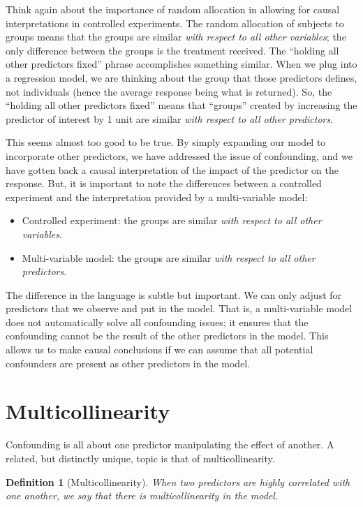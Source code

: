 \documentclass[
]{book}
\providecommand{\tightlist}{%
  \setlength{\itemsep}{0pt}\setlength{\parskip}{0pt}}
\theoremstyle{plain}
\theoremstyle{mydefn}
\newtheorem{definition}{Definition}[chapter]
\theoremstyle{myexmpl}
\theoremstyle{remark}
\begin{document}
Think again about the importance of random allocation in allowing for causal interpretations in controlled experiments. The random allocation of subjects to groups means that the groups are similar \emph{with respect to all other variables}; the only difference between the groups is the treatment received. The ``holding all other predictors fixed'' phrase accomplishes something similar. When we plug into a regression model, we are thinking about the group that those predictors defines, not individuals (hence the average response being what is returned). So, the ``holding all other predictors fixed'' means that ``groups'' created by increasing the predictor of interest by 1 unit are similar \emph{with respect to all other predictors}.

This seems almost too good to be true. By simply expanding our model to incorporate other predictors, we have addressed the issue of confounding, and we have gotten back a causal interpretation of the impact of the predictor on the response. But, it is important to note the differences between a controlled experiment and the interpretation provided by a multi-variable model:

\begin{itemize}
\tightlist
\item
  Controlled experiment: the groups are similar \emph{with respect to all other variables}.
\item
  Multi-variable model: the groups are similar \emph{with respect to all other predictors}.
\end{itemize}

The difference in the language is subtle but important. We can only adjust for predictors that we observe and put in the model. That is, a multi-variable model does not automatically solve all confounding issues; it ensures that the confounding cannot be the result of the other predictors in the model. This allows us to make causal conclusions if we can assume that all potential confounders are present as other predictors in the model.

\hypertarget{multicollinearity}{%
\section{Multicollinearity}\label{multicollinearity}}

Confounding is all about one predictor manipulating the effect of another. A related, but distinctly unique, topic is that of multicollinearity.

\begin{definition}[Multicollinearity]
\protect\hypertarget{def:defn-multicollinearity}{}{\label{def:defn-multicollinearity} {} }When two predictors are highly correlated with one another, we say that there is multicollinearity in the model.
\end{definition}
\end{document}
